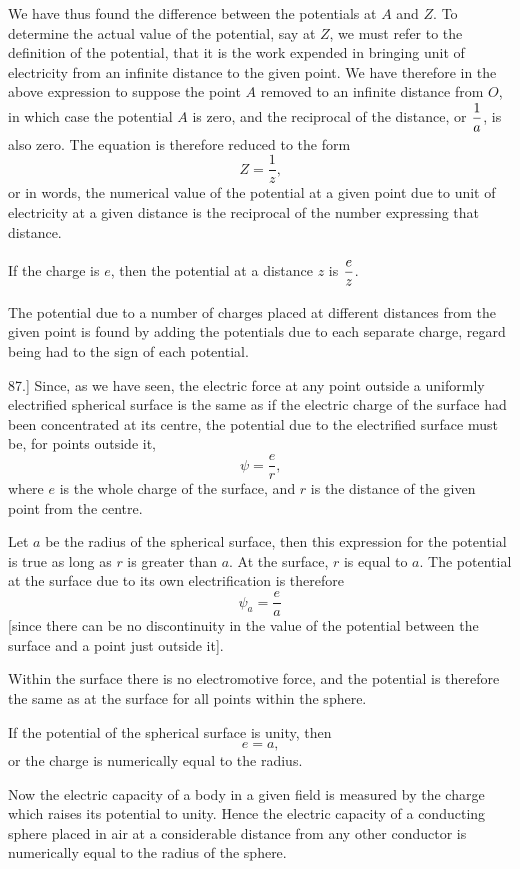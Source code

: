 \documentclass[12pt,oneside]{book}[2021/10/04]
\newcommand{\article}[1]{\phantomsection \label{art:#1}{#1.]}}
\newcommand{\xp}{\rule[-2.0ex]{0pt}{5.2ex}}
\newcommand{\¬}{\hphantom{0}}
\begin{document}
We have thus found the difference between the potentials at
\(A\) and \(Z\). To determine the actual value of the potential, say at \(Z\),
we must refer to the definition of the potential, that it is the
work expended in bringing unit of electricity from an infinite
distance to the given point. We have therefore in the above
expression to suppose the point \(A\) removed to an infinite distance
from \(O\), in which case the potential \(A\) is zero, and the reciprocal of
the distance, or \(\xp\dfrac{1}{a}\), is also zero. The equation is therefore reduced to
the form
\[
Z = \frac{1}{z}\text{,}
\]
or in words, the numerical value of the potential at a given point
due to unit of electricity at a given distance is the reciprocal of the
number expressing that distance.

If the charge is \(e\), then the potential at a distance \(z\) is \(\xp\dfrac{e}{z}\).

The potential due to a number of charges placed at different
distances from the given point is found by adding the potentials
due to each separate charge, regard being had to the sign of each
potential.

\article{87} Since, as we have seen, the electric force at any point
outside a uniformly electrified spherical surface is the same as if the
electric charge of the surface had been concentrated at its centre,
the potential due to the electrified surface must be, for points
outside it,
\[
\psi = \frac{e}{r}\text{,}
\]
where \(e\) is the whole charge of the surface, and \(r\) is the distance of
the given point from the centre.

Let \(a\) be the radius of the spherical surface, then this expression
for the potential is true as long as \(r\) is greater than \(a\). At the
surface, \(r\) is equal to \(a\). The potential at the surface due to its
own electrification is therefore
\[
\psi_a = \frac{e}{a}
\]
[since there can be no discontinuity in the value of the potential
between the surface and a point just outside it].

Within the surface there is no electromotive force, and the
potential is therefore the same as at the surface for all points
within the sphere.

If the potential of the spherical surface is unity, then
\[
e = a\text{,}
\]
or the charge is numerically equal to the radius.

Now the electric capacity of a body in a given field is measured
by the charge which raises its potential to unity. Hence the
electric capacity of a conducting sphere placed in air at a considerable
distance from any other conductor is numerically equal
to the radius of the sphere.
\end{document}
